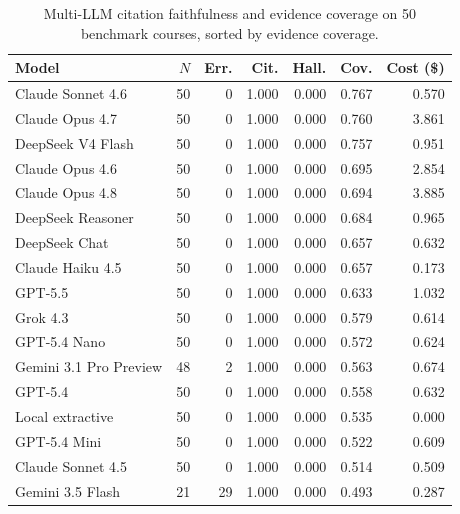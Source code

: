 \begin{table}[t]
\centering
\caption{Multi-LLM citation faithfulness and evidence coverage on 50 benchmark courses, sorted by evidence coverage.}
\label{tab:multi-llm-faithfulness}
\footnotesize
\begin{tabular}{lrrrrrr}
\hline
Model & $N$ & Err. & Cit. & Hall. & Cov. & Cost (\$) \\
\hline
Claude Sonnet 4.6 & 50 & 0 & 1.000 & 0.000 & 0.767 & 0.570 \\
Claude Opus 4.7 & 50 & 0 & 1.000 & 0.000 & 0.760 & 3.861 \\
DeepSeek V4 Flash & 50 & 0 & 1.000 & 0.000 & 0.757 & 0.951 \\
Claude Opus 4.6 & 50 & 0 & 1.000 & 0.000 & 0.695 & 2.854 \\
Claude Opus 4.8 & 50 & 0 & 1.000 & 0.000 & 0.694 & 3.885 \\
DeepSeek Reasoner & 50 & 0 & 1.000 & 0.000 & 0.684 & 0.965 \\
DeepSeek Chat & 50 & 0 & 1.000 & 0.000 & 0.657 & 0.632 \\
Claude Haiku 4.5 & 50 & 0 & 1.000 & 0.000 & 0.657 & 0.173 \\
GPT-5.5 & 50 & 0 & 1.000 & 0.000 & 0.633 & 1.032 \\
Grok 4.3 & 50 & 0 & 1.000 & 0.000 & 0.579 & 0.614 \\
GPT-5.4 Nano & 50 & 0 & 1.000 & 0.000 & 0.572 & 0.624 \\
Gemini 3.1 Pro Preview & 48 & 2 & 1.000 & 0.000 & 0.563 & 0.674 \\
GPT-5.4 & 50 & 0 & 1.000 & 0.000 & 0.558 & 0.632 \\
Local extractive & 50 & 0 & 1.000 & 0.000 & 0.535 & 0.000 \\
GPT-5.4 Mini & 50 & 0 & 1.000 & 0.000 & 0.522 & 0.609 \\
Claude Sonnet 4.5 & 50 & 0 & 1.000 & 0.000 & 0.514 & 0.509 \\
Gemini 3.5 Flash & 21 & 29 & 1.000 & 0.000 & 0.493 & 0.287 \\
\hline
\end{tabular}
\end{table}
